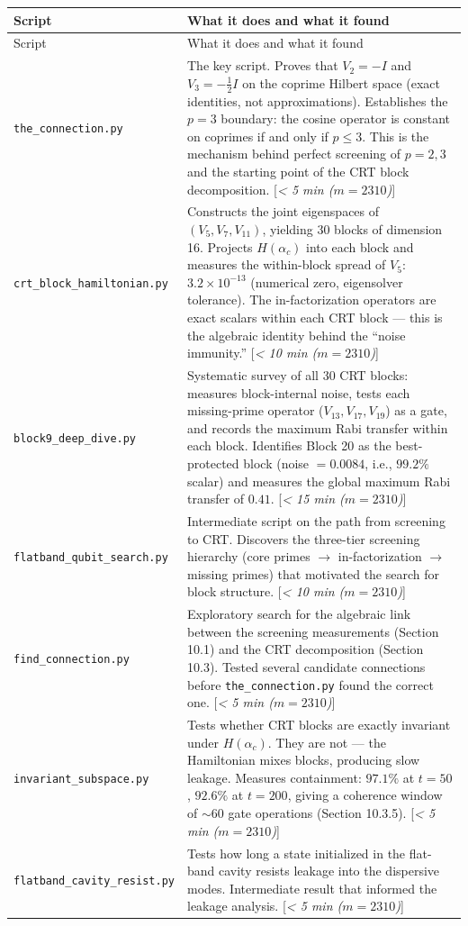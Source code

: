 \documentclass[11pt,letterpaper]{article}
\theoremstyle{definition}
\theoremstyle{remark}
\begin{document}
\begin{longtable}[]{@{}
  >{\raggedright\arraybackslash}p{}
  >{\raggedright\arraybackslash}p{}@{}}
\toprule
Script & What it does and what it found \\
\midrule
\endfirsthead
\toprule
Script & What it does and what it found \\
\midrule
\endhead
\texttt{the\_connection.py} & The key script. Proves that $V_2 = -I$ and $V_3 = -\frac{1}{2}I$ on the coprime Hilbert space (exact identities, not approximations). Establishes the $p = 3$ boundary: the cosine operator is constant on coprimes if and only if $p \leq 3$. This is the mechanism behind perfect screening of $p = 2, 3$ and the starting point of the CRT block decomposition. [\textit{\textless{} 5 min ($m = 2310$)}] \\
\texttt{crt\_block\_hamiltonian.py} & Constructs the joint eigenspaces of $(V_5, V_7, V_{11})$, yielding 30 blocks of dimension 16. Projects $H(\alpha_c)$ into each block and measures the within-block spread of $V_5$: $3.2 \times 10^{-13}$ (numerical zero, eigensolver tolerance). The in-factorization operators are exact scalars within each CRT block --- this is the algebraic identity behind the ``noise immunity.'' [\textit{\textless{} 10 min ($m = 2310$)}] \\
\texttt{block9\_deep\_dive.py} & Systematic survey of all 30 CRT blocks: measures block-internal noise, tests each missing-prime operator ($V_{13}, V_{17}, V_{19}$) as a gate, and records the maximum Rabi transfer within each block. Identifies Block 20 as the best-protected block (noise $= 0.0084$, i.e., $99.2\%$ scalar) and measures the global maximum Rabi transfer of $0.41$. [\textit{\textless{} 15 min ($m = 2310$)}] \\
\texttt{flatband\_qubit\_search.py} & Intermediate script on the path from screening to CRT. Discovers the three-tier screening hierarchy (core primes $\to$ in-factorization $\to$ missing primes) that motivated the search for block structure. [\textit{\textless{} 10 min ($m = 2310$)}] \\
\texttt{find\_connection.py} & Exploratory search for the algebraic link between the screening measurements (Section 10.1) and the CRT decomposition (Section 10.3). Tested several candidate connections before \texttt{the\_connection.py} found the correct one. [\textit{\textless{} 5 min ($m = 2310$)}] \\
\texttt{invariant\_subspace.py} & Tests whether CRT blocks are exactly invariant under $H(\alpha_c)$. They are not --- the Hamiltonian mixes blocks, producing slow leakage. Measures containment: $97.1\%$ at $t = 50$, $92.6\%$ at $t = 200$, giving a coherence window of $\sim 60$ gate operations (Section 10.3.5). [\textit{\textless{} 5 min ($m = 2310$)}] \\
\texttt{flatband\_cavity\_resist.py} & Tests how long a state initialized in the flat-band cavity resists leakage into the dispersive modes. Intermediate result that informed the leakage analysis. [\textit{\textless{} 5 min ($m = 2310$)}] \\
\end{longtable}
\end{document}
